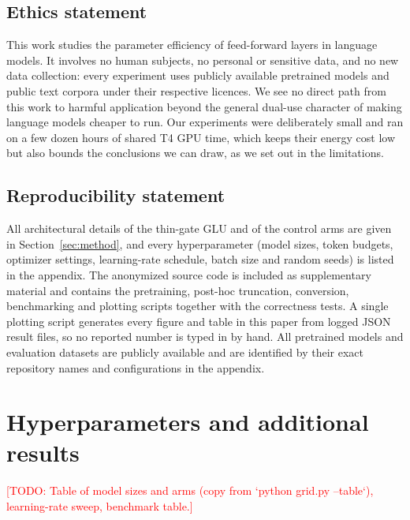 \documentclass{article}
\newcommand{\todo}[1]{\textcolor{red}{[TODO: #1]}}
\begin{document}
\subsection*{Ethics statement}
This work studies the parameter efficiency of feed-forward layers in language models. It involves no human
subjects, no personal or sensitive data, and no new data collection: every experiment uses publicly available
pretrained models and public text corpora under their respective licences. We see no direct path from this
work to harmful application beyond the general dual-use character of making language models cheaper to run.
Our experiments were deliberately small and ran on a few dozen hours of shared T4 GPU time, which keeps
their energy cost low but also bounds the conclusions we can draw, as we set out in the limitations.

\subsection*{Reproducibility statement}
All architectural details of the thin-gate GLU and of the control arms are given in
Section~\ref{sec:method}, and every hyperparameter (model sizes, token budgets, optimizer settings,
learning-rate schedule, batch size and random seeds) is listed in the appendix. The anonymized source code
is included as supplementary material and contains the pretraining, post-hoc truncation, conversion,
benchmarking and plotting scripts together with the correctness tests. A single plotting script generates every
figure and table in this paper from logged JSON result files, so no reported number is typed in by hand. All pretrained models and evaluation datasets are publicly available and are identified by their
exact repository names and configurations in the appendix.




\appendix
\section{Hyperparameters and additional results}
\todo{Table of model sizes and arms (copy from `python grid.py --table`), learning-rate sweep, benchmark table.}

\begin{table}[h]
  \centering
  \caption{Screened alternatives to a low-rank gate at the parameter count of thin-gate $r/d = 1/4$, size S,
  with shrunk $r/d = 1/4$ as the reference. Arms with one seed are from the first screen; the tied and
  thin+tied blocks have three seeds. Arms stopped by the early-kill rule are not listed.}
  \label{tab:screen}
  \small
  
\end{table}
\end{document}
